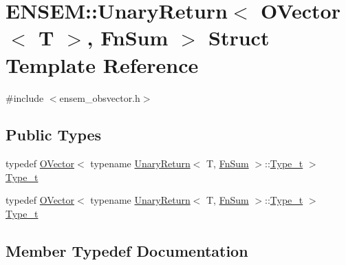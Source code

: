 \hypertarget{structENSEM_1_1UnaryReturn_3_01OVector_3_01T_01_4_00_01FnSum_01_4}{}\section{E\+N\+S\+EM\+:\+:Unary\+Return$<$ O\+Vector$<$ T $>$, Fn\+Sum $>$ Struct Template Reference}
\label{structENSEM_1_1UnaryReturn_3_01OVector_3_01T_01_4_00_01FnSum_01_4}


{\ttfamily \#include $<$ensem\+\_\+obsvector.\+h$>$}

\subsection*{Public Types}
\begin{DoxyCompactItemize}
\item 
typedef \mbox{\hyperlink{classENSEM_1_1OVector}{O\+Vector}}$<$ typename \mbox{\hyperlink{structENSEM_1_1UnaryReturn}{Unary\+Return}}$<$ T, \mbox{\hyperlink{structENSEM_1_1FnSum}{Fn\+Sum}} $>$\+::\mbox{\hyperlink{structENSEM_1_1UnaryReturn_3_01OVector_3_01T_01_4_00_01FnSum_01_4_aeade0fc333784b1705f2ab3348b5fed1}{Type\+\_\+t}} $>$ \mbox{\hyperlink{structENSEM_1_1UnaryReturn_3_01OVector_3_01T_01_4_00_01FnSum_01_4_aeade0fc333784b1705f2ab3348b5fed1}{Type\+\_\+t}}
\item 
typedef \mbox{\hyperlink{classENSEM_1_1OVector}{O\+Vector}}$<$ typename \mbox{\hyperlink{structENSEM_1_1UnaryReturn}{Unary\+Return}}$<$ T, \mbox{\hyperlink{structENSEM_1_1FnSum}{Fn\+Sum}} $>$\+::\mbox{\hyperlink{structENSEM_1_1UnaryReturn_3_01OVector_3_01T_01_4_00_01FnSum_01_4_aeade0fc333784b1705f2ab3348b5fed1}{Type\+\_\+t}} $>$ \mbox{\hyperlink{structENSEM_1_1UnaryReturn_3_01OVector_3_01T_01_4_00_01FnSum_01_4_aeade0fc333784b1705f2ab3348b5fed1}{Type\+\_\+t}}
\end{DoxyCompactItemize}


\subsection{Member Typedef Documentation}
\mbox{\label{structENSEM_1_1UnaryReturn_3_01OVector_3_01T_01_4_00_01FnSum_01_4_aeade0fc333784b1705f2ab3348b5fed1}} 
